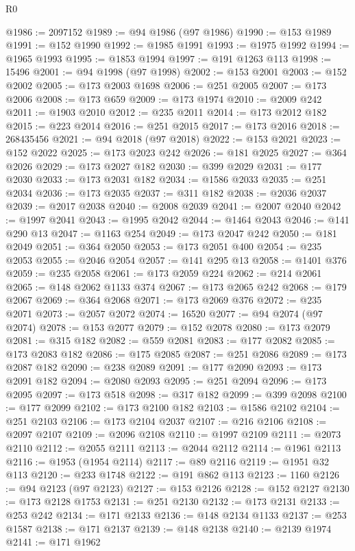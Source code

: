 \begin{lexlean}{R0}
\begin{coremodule}
@1986 := 2097152
@1989 := @94 @1986 (@97 @1986)
@1990 := @153 @1989
@1991 := @152 @1990
@1992 := @1985 @1991
@1993 := @1975 @1992
@1994 := @1965 @1993
@1995 := @1853 @1994
@1997 := @191 @1263 @113
@1998 := 15496
@2001 := @94 @1998 (@97 @1998)
@2002 := @153 @2001
@2003 := @152 @2002
@2005 := @173 @2003 @1698
@2006 := @251 @2005
@2007 := @173 @2006
@2008 := @173 @659
@2009 := @173 @1974
@2010 := @2009 @242
@2011 := @1903 @2010
@2012 := @235 @2011
@2014 := @173 @2012 @182
@2015 := @223 @2014
@2016 := @251 @2015
@2017 := @173 @2016
@2018 := 268435456
@2021 := @94 @2018 (@97 @2018)
@2022 := @153 @2021
@2023 := @152 @2022
@2025 := @173 @2023 @242
@2026 := @181 @2025
@2027 := @364 @2026
@2029 := @173 @2027 @182
@2030 := @399 @2029
@2031 := @177 @2030
@2033 := @173 @2031 @182
@2034 := @1586 @2033
@2035 := @251 @2034
@2036 := @173 @2035
@2037 := @311 @182
@2038 := @2036 @2037
@2039 := @2017 @2038
@2040 := @2008 @2039
@2041 := @2007 @2040
@2042 := @1997 @2041
@2043 := @1995 @2042
@2044 := @1464 @2043
@2046 := @141 @290 @13
@2047 := @1163 @254
@2049 := @173 @2047 @242
@2050 := @181 @2049
@2051 := @364 @2050
@2053 := @173 @2051 @400
@2054 := @235 @2053
@2055 := @2046 @2054
@2057 := @141 @295 @13
@2058 := @1401 @376
@2059 := @235 @2058
@2061 := @173 @2059 @224
@2062 := @214 @2061
@2065 := @148 @2062 @1133 @374
@2067 := @173 @2065 @242
@2068 := @179 @2067
@2069 := @364 @2068
@2071 := @173 @2069 @376
@2072 := @235 @2071
@2073 := @2057 @2072
@2074 := 16520
@2077 := @94 @2074 (@97 @2074)
@2078 := @153 @2077
@2079 := @152 @2078
@2080 := @173 @2079
@2081 := @315 @182
@2082 := @559 @2081
@2083 := @177 @2082
@2085 := @173 @2083 @182
@2086 := @175 @2085
@2087 := @251 @2086
@2089 := @173 @2087 @182
@2090 := @238 @2089
@2091 := @177 @2090
@2093 := @173 @2091 @182
@2094 := @2080 @2093
@2095 := @251 @2094
@2096 := @173 @2095
@2097 := @173 @518
@2098 := @317 @182
@2099 := @399 @2098
@2100 := @177 @2099
@2102 := @173 @2100 @182
@2103 := @1586 @2102
@2104 := @251 @2103
@2106 := @173 @2104 @2037
@2107 := @216 @2106
@2108 := @2097 @2107
@2109 := @2096 @2108
@2110 := @1997 @2109
@2111 := @2073 @2110
@2112 := @2055 @2111
@2113 := @2044 @2112
@2114 := @1961 @2113
@2116 := @1953 (@1954 @2114)
@2117 := @89 @2116
@2119 := @1951 @32 @113
@2120 := @233 @1748
@2122 := @191 @862 @113
@2123 := 1160
@2126 := @94 @2123 (@97 @2123)
@2127 := @153 @2126
@2128 := @152 @2127
@2130 := @173 @2128 @1753
@2131 := @251 @2130
@2132 := @173 @2131
@2133 := @253 @242
@2134 := @171 @2133
@2136 := @148 @2134 @1133
@2137 := @253 @1587
@2138 := @171 @2137
@2139 := @148 @2138
@2140 := @2139 @1974
@2141 := @171 @1962

\end{coremodule}
\end{lexlean}
